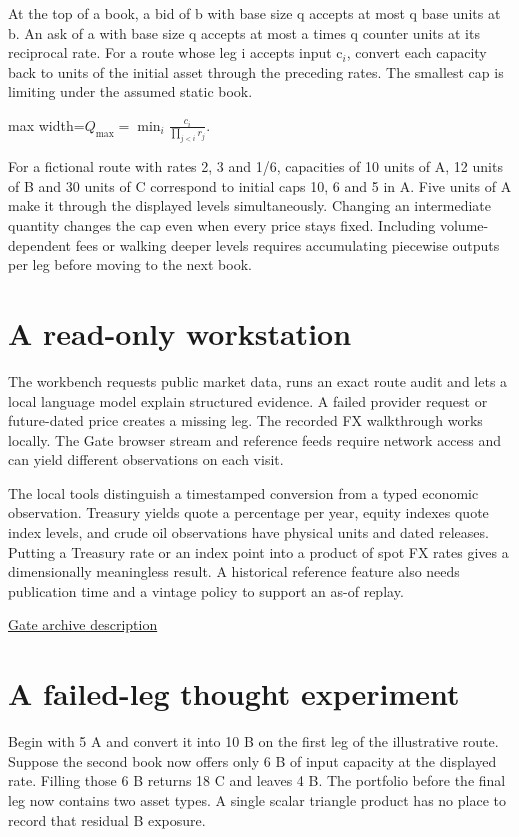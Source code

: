 \documentclass[11pt,oneside,openany]{book}
\begin{document}
At the top of a book, a bid of b with base size q accepts at most q base units at b. An ask of a with base size q accepts at most a times q counter units at its reciprocal rate. For a route whose leg i accepts input c\ensuremath{_i}, convert each capacity back to units of the initial asset through the preceding rates. The smallest cap is limiting under the assumed static book.

\begin{center}\begin{adjustbox}{max width=\linewidth}$\displaystyle Q_{\max}=\min_i\frac{c_i}{\prod_{j<i}r_j}.$\end{adjustbox}\end{center}
For a fictional route with rates 2, 3 and 1/6, capacities of 10 units of A, 12 units of B and 30 units of C correspond to initial caps 10, 6 and 5 in A. Five units of A make it through the displayed levels simultaneously. Changing an intermediate quantity changes the cap even when every price stays fixed. Including volume-dependent fees or walking deeper levels requires accumulating piecewise outputs per leg before moving to the next book.

\section*{A read-only workstation}
The workbench requests public market data, runs an exact route audit and lets a local language model explain structured evidence. A failed provider request or future-dated price creates a missing leg. The recorded FX walkthrough works locally. The Gate browser stream and reference feeds require network access and can yield different observations on each visit.

The local tools distinguish a timestamped conversion from a typed economic observation. Treasury yields quote a percentage per year, equity indexes quote index levels, and crude oil observations have physical units and dated releases. Putting a Treasury rate or an index point into a product of spot FX rates gives a dimensionally meaningless result. A historical reference feature also needs publication time and a vintage policy to support an as-of replay.

{\small\sffamily\href{https://www.gate.com/help/annlist/others/21688/Gate.io-Makes-all-Historical-Data-Downloads-Available-Transactions-Depth-Contract-Snapshots-for-Quantitative-Backtesting}{Gate archive description}\par}
\section*{A failed-leg thought experiment}
Begin with 5 A and convert it into 10 B on the first leg of the illustrative route. Suppose the second book now offers only 6 B of input capacity at the displayed rate. Filling those 6 B returns 18 C and leaves 4 B. The portfolio before the final leg now contains two asset types. A single scalar triangle product has no place to record that residual B exposure.
\end{document}
